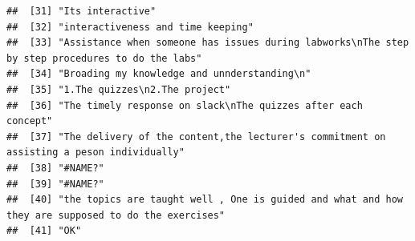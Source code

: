 \documentclass[
]{article}
\begin{document}
\begin{verbatim}
##  [31] "Its interactive"                                                                                                                                                                                                                                  
##  [32] "interactiveness and time keeping"                                                                                                                                                                                                                 
##  [33] "Assistance when someone has issues during labworks\nThe step by step procedures to do the labs"                                                                                                                                                   
##  [34] "Broading my knowledge and unnderstanding\n"                                                                                                                                                                                                       
##  [35] "1.The quizzes\n2.The project"                                                                                                                                                                                                                     
##  [36] "The timely response on slack\nThe quizzes after each concept"                                                                                                                                                                                     
##  [37] "The delivery of the content,the lecturer's commitment on assisting a peson individually"                                                                                                                                                          
##  [38] "#NAME?"                                                                                                                                                                                                                                           
##  [39] "#NAME?"                                                                                                                                                                                                                                           
##  [40] "the topics are taught well , One is guided and what and how they are supposed to do the exercises"                                                                                                                                                
##  [41] "OK"                                                                                                                                                                                                                                               

\end{verbatim}
\end{document}
